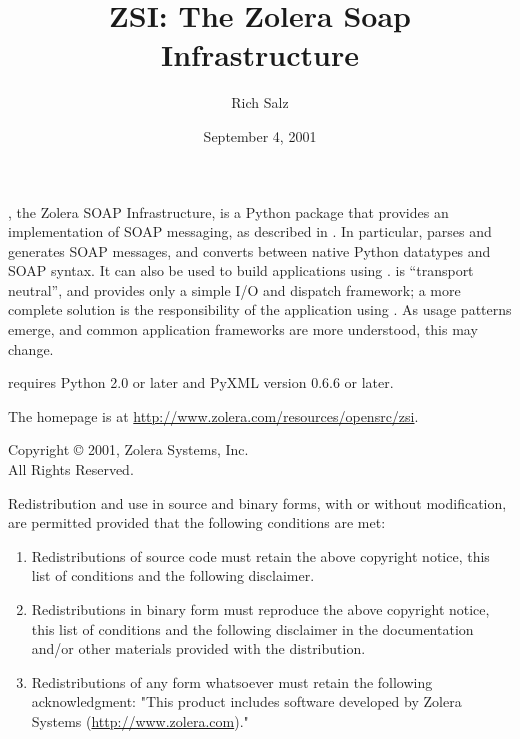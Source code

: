 \documentclass{manual}
\title{ZSI: The Zolera Soap Infrastructure}
\author{Rich Salz}
\date{September 4, 2001}
\begin{document}
\maketitle

\centerline{}

, the Zolera SOAP Infrastructure, is a Python package that
provides an implementation of SOAP messaging, as described in
.
In particular,  parses and generates SOAP messages, and
converts between native Python datatypes and SOAP syntax.
It can also be used to build applications using
.
 is ``transport neutral'', and provides only a simple
I/O and dispatch framework; a more complete solution is the
responsibility of the application using .
As usage patterns emerge, and common application frameworks are
more understood, this may change.

 requires Python 2.0 or later and PyXML version 0.6.6 or later.

The  homepage is at
\url{http://www.zolera.com/resources/opensrc/zsi}.

\vfill

\centerline{}

Copyright \copyright{} 2001, Zolera Systems, Inc.\\
All Rights Reserved.

Redistribution and use in source and binary forms, with or without
modification, are permitted provided that the following conditions
are met:

\begin{enumerate}

\item
Redistributions of source code must retain the above copyright
notice, this list of conditions and the following disclaimer. 

\item
Redistributions in binary form must reproduce the above copyright
notice, this list of conditions and the following disclaimer in
the documentation and/or other materials provided with the
distribution.

\item
Redistributions of any form whatsoever must retain the following
acknowledgment:
"This product includes software developed by Zolera Systems
(\url{http://www.zolera.com})."

\end{enumerate}
\end{document}
